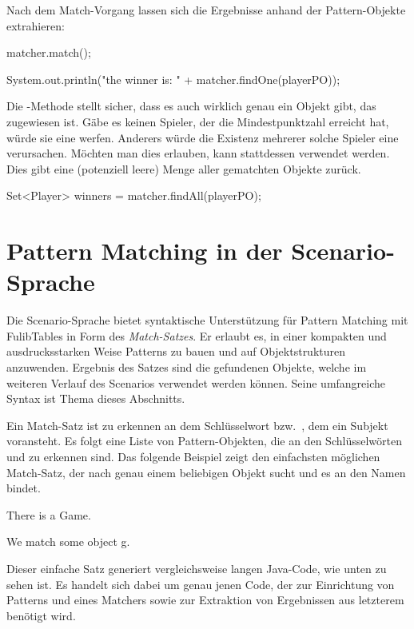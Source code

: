 Nach dem Match-Vorgang lassen sich die Ergebnisse anhand der Pattern-Objekte extrahieren:

\begin{jcodeblock}
    matcher.match();

    System.out.println("the winner is: " + matcher.findOne(playerPO));
\end{jcodeblock}

Die -Methode stellt sicher, dass es auch wirklich genau ein Objekt gibt, das  zugewiesen ist.
Gäbe es keinen Spieler, der die Mindestpunktzahl erreicht hat, würde sie eine  werfen.
Anderers würde die Existenz mehrerer solche Spieler eine  verursachen.
Möchten man dies erlauben, kann stattdessen  verwendet werden.
Dies gibt eine (potenziell leere) Menge aller gematchten Objekte zurück.

\begin{jcodeblock}
    Set<Player> winners = matcher.findAll(playerPO);
\end{jcodeblock}

\section{Pattern Matching in der Scenario-Sprache}\label{sec:scenario-pattern-matching}

Die Scenario-Sprache bietet syntaktische Unterstützung für Pattern Matching mit FulibTables in Form des \emph{Match-Satzes}.
Er erlaubt es, in einer kompakten und ausdrucksstarken Weise Patterns zu bauen und auf Objektstrukturen anzuwenden.
Ergebnis des Satzes sind die gefundenen Objekte, welche im weiteren Verlauf des Scenarios verwendet werden können.
Seine umfangreiche Syntax ist Thema dieses Abschnitts.

Ein Match-Satz ist zu erkennen an dem Schlüsselwort  bzw.\ , dem ein Subjekt voransteht.
Es folgt eine Liste von Pattern-Objekten, die an den Schlüsselwörten  und  zu erkennen sind.
Das folgende Beispiel zeigt den einfachsten möglichen Match-Satz, der nach genau einem beliebigen Objekt sucht und es an den Namen  bindet.

\begin{mdcodeblock}
    There is a Game.

    We match some object g.
\end{mdcodeblock}

Dieser einfache Satz generiert vergleichsweise langen Java-Code, wie unten zu sehen ist.
Es handelt sich dabei um genau jenen Code, der zur Einrichtung von Patterns und eines Matchers sowie zur Extraktion von Ergebnissen aus letzterem benötigt wird.

